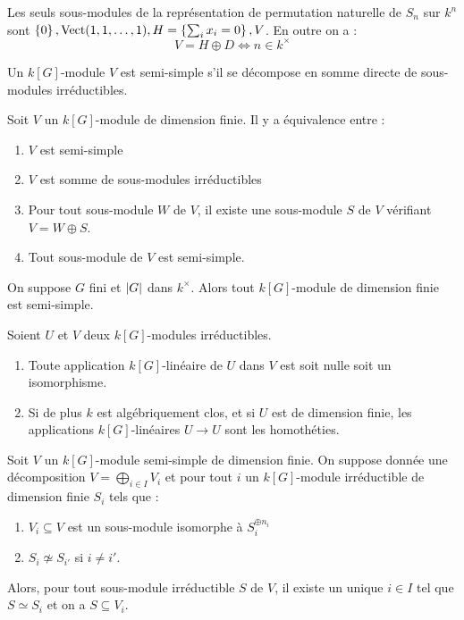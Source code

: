 \documentclass{cours}
\begin{document}
\begin{proposition}
    Les seuls sous-modules de la représentation de permutation naturelle de $S_{n}$ sur $k^{n}$ sont $\left\{0\right\}, \operatorname{Vect}(1, 1,\ldots, 1), H = \left\{\sum_{i} x_{i} = 0\right\}, V$. En outre on a :
    \[
        V = H \oplus D \Longleftrightarrow n \in k^{\times}
    \]
\end{proposition}

\begin{definition}
    Un $k[G]$-module $V$ est semi-simple s'il se décompose en somme directe de sous-modules irréductibles.
\end{definition}

\begin{proposition}
    Soit $V$ un $k[G]$-module de dimension finie. Il y a équivalence entre :
    \begin{enumerate}
        \item $V$ est semi-simple
        \item $V$ est somme de sous-modules irréductibles
        \item Pour tout sous-module $W$ de $V$, il existe une sous-module $S$ de $V$ vérifiant $V = W \oplus S$.
        \item Tout sous-module de $V$ est semi-simple.
    \end{enumerate}
\end{proposition}

\begin{theorem}
    On suppose $G$ fini et $\left|G\right|$ dans $k^{\times}$. Alors tout $k[G]$-module de dimension finie est semi-simple.
\end{theorem}

\begin{lemma}
    Soient $U$ et $V$ deux $k[G]$-modules irréductibles.
    \begin{enumerate}
        \item Toute application $k[G]$-linéaire de $U$ dans $V$ est soit nulle soit un isomorphisme.
        \item Si de plus $k$ est algébriquement clos, et si $U$ est de dimension finie, les applications $k[G]$-linéaires $U \rightarrow U$ sont les homothéties.
    \end{enumerate}
\end{lemma}

\begin{proposition}
    Soit $V$ un $k[G]$-module semi-simple de dimension finie. On suppose donnée une décomposition $V = \bigoplus_{i \in I} V_{i}$ et pour tout $i$ un $k[G]$-module irréductible de dimension finie $S_{i}$ tels que :
    \begin{enumerate}
        \item $V_{i} \subseteq V$ est un sous-module isomorphe à $S_{i}^{\oplus n_{i}}$
        \item $S_{i} \not \simeq S_{i'}$ si $i \neq i'$.
    \end{enumerate}
    Alors, pour tout sous-module irréductible $S$ de $V$, il existe un unique $i \in I$ tel que $S \simeq S_{i}$ et on a $S \subseteq V_{i}$.
\end{proposition}
\end{document}
